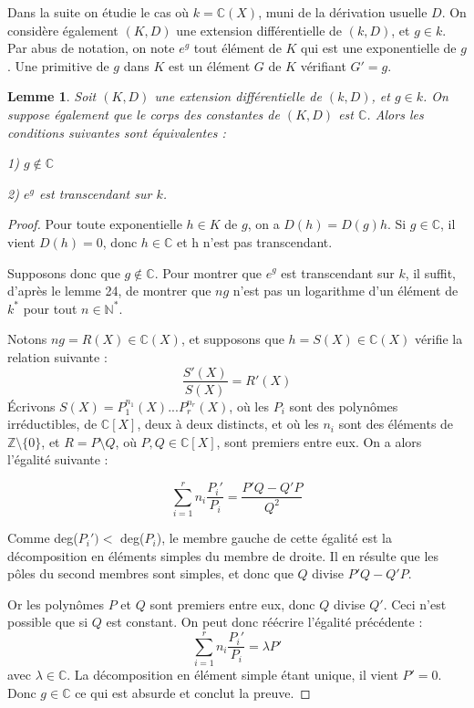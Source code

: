 \documentclass[12pt,a4paper]{report}
\newtheorem{lem}[thm]{\bf Lemme}
\begin{document}
Dans la suite on étudie le cas où $k=\mathbb{C}(X)$, muni de la dérivation usuelle $D$. On considère également $(K,D)$ une extension différentielle de $(k,D)$, et $g \in k$. Par abus de notation, on note $e^{g}$ tout élément de $K$ qui est une exponentielle de $g$. Une primitive de $g$ dans $K$ est un élément $G$ de $K$ vérifiant $G'=g$.

\begin{lem}\rm
Soit $(K,D)$ une extension différentielle de $(k,D)$, et $g\in k$. On suppose également que le corps des constantes de $(K,D)$ est $\mathbb{C}$. Alors les conditions suivantes sont équivalentes : 

1) $g\notin \mathbb{C}$

2) $e^{g}$ est transcendant sur $k$. 

\end{lem}

\begin{proof}
Pour toute exponentielle $h \in K$ de $g$, on a $D(h)=D(g)h.$ Si $g\in \mathbb{C}$, il vient $D(h)=0$, donc $h\in \mathbb{C}$ et h n'est pas transcendant. 

Supposons donc que $g\notin \mathbb{C}$. Pour montrer que $e^{g}$ est transcendant sur $k$, il suffit, d'après le lemme 24, de montrer que $ng$ n'est pas un logarithme d'un élément de $k^{*}$ pour tout $n\in \mathbb{N}^{*}.$

Notons $ng=R(X) \in \mathbb{C}(X)$, et supposons que $h=S(X) \in \mathbb{C}(X)$ vérifie la relation suivante : 
$$\dfrac{S'(X)}{S(X)}=R'(X)$$
Écrivons $S(X)=P_{1}^{n_{1}}(X)...P_{r}^{n_{r}}(X)$, où les $P_{i}$ sont des polynômes irréductibles, de $\mathbb{C}[X]$, deux à deux distincts, et où les $n_{i}$ sont des éléments de $\mathbb{Z} \setminus \{0\}$, et $R=P\setminus Q$, où $P,Q \in \mathbb{C}[X]$, sont premiers entre eux. On a alors l'égalité suivante : 

$$\sum_{i=1}^{r}n_{i}\dfrac{P_{i}'}{P_{i}}=\dfrac{P'Q-Q'P}{Q^{2}}$$

Comme deg($P_{i}')<$ deg($P_{i}$), le membre gauche de cette égalité est la décomposition en éléments simples du membre de droite. Il en résulte que les pôles du second membres sont simples, et donc que $Q$ divise $P'Q-Q'P$. 

Or les polynômes $P$ et $Q$ sont premiers entre eux, donc $Q$ divise $Q'$. Ceci n'est possible que si $Q$ est constant. On peut donc réécrire l'égalité précédente : 
$$ \sum_{i=1}^{r}n_{i}\dfrac{P_{i}'}{P_{i}}=\lambda P'$$
avec $\lambda \in \mathbb{C}$. 
La décomposition en élément simple étant unique, il vient $P'=0$. Donc $g\in \mathbb{C}$ ce qui est absurde et conclut la preuve. 

\end{proof}
\end{document}
